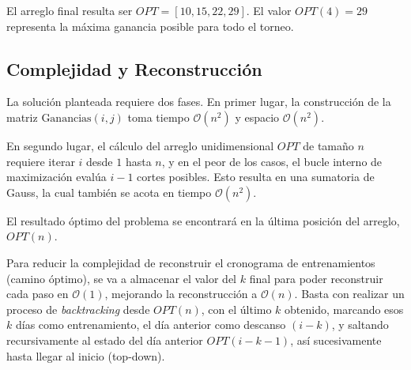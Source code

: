 El arreglo final resulta ser $OPT = [10, 15, 22, 29]$. El valor $OPT(4) = 29$ representa la máxima ganancia posible para todo el torneo.

\subsection{Complejidad y Reconstrucción}

La solución planteada requiere dos fases. En primer lugar, la construcción de la matriz $\text{Ganancias}(i, j)$ toma tiempo $\mathcal{O}(n^2)$ y espacio $\mathcal{O}(n^2)$. 

En segundo lugar, el cálculo del arreglo unidimensional $OPT$ de tamaño $n$ requiere iterar $i$ desde $1$ hasta $n$, y en el peor de los casos, el bucle interno de maximización evalúa $i-1$ cortes posibles. Esto resulta en una sumatoria de Gauss, la cual también se acota en tiempo $\mathcal{O}(n^2)$.

El resultado óptimo del problema se encontrará en la última posición del arreglo, $OPT(n)$. 

Para reducir la complejidad de reconstruir el cronograma de entrenamientos (camino óptimo), se va a almacenar el valor del $k$ final para poder reconstruir cada paso en $\mathcal{O}(1)$, mejorando la reconstrucción a $\mathcal{O}(n)$. Basta con realizar un proceso de \textit{backtracking} desde $OPT(n)$, con el último $k$ obtenido, marcando esos $k$ días como entrenamiento, el día anterior como descanso $(i-k)$, y saltando recursivamente al estado del día anterior $OPT(i-k-1)$, así sucesivamente hasta llegar al inicio (top-down).